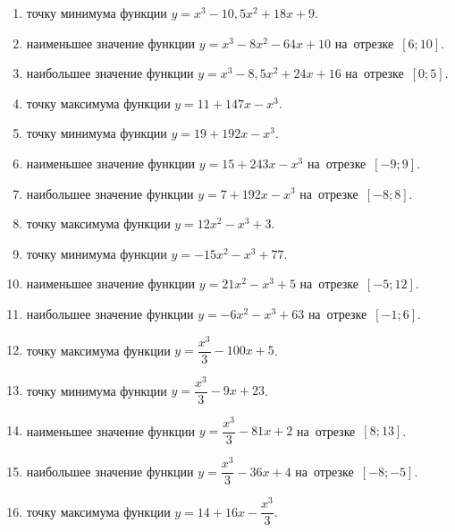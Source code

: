 \documentclass[a4paper,10pt]{article}
\begin{document}
\begin{enumerate}
\item {} точку минимума функции $y=x^3 -10,5x^2+18x+9$.

\item {} наименьшее значение функции $y=x^3 -8x^2-64x+10$ на~отрезке~$\left[6;10\right]$.

\item {} наибольшее значение функции $y=x^3 -8,5x^2+24x+16$ на~отрезке~$\left[0;5\right]$.

\item {} точку максимума функции $y=11+147x-x^3$.

\item {} точку минимума функции $y=19+192x-x^3$.

\item {} наименьшее значение функции $y=15+243x-x^3$ на~отрезке~$\left[-9;9\right]$.

\item {} наибольшее значение функции $y=7+192x-x^3$ на~отрезке~$\left[-8;8\right]$.

\item {} точку максимума функции $y=12x^2-x^3+3$.

\item {} точку минимума функции $y=-15x^2-x^3+77$.

\item {} наименьшее значение функции $y=21x^2-x^3+5$ на~отрезке~$\left[-5;12\right]$.

\item {} наибольшее значение функции $y=-6x^2-x^3+63$ на~отрезке~$\left[-1;6\right]$.

\item {} точку максимума функции $y=\dfrac{x^3}{3} -100x+5$.

\item {} точку минимума функции $y=\dfrac{x^3}{3} -9x+23$.

\item {} наименьшее значение функции $y=\dfrac{x^3}{3} -81x+2$ на~отрезке~$\left[8;13\right]$.

\item {} наибольшее значение функции $y=\dfrac{x^3}{3} -36x+4$ на~отрезке~$\left[-8;-5\right]$.

\item {} точку максимума функции $y=14 +16x-\dfrac{x^3}{3}$.


\end{enumerate}
\end{document}
